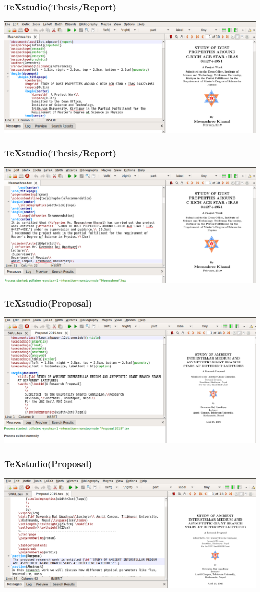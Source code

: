 \documentclass{beamer}
\begin{document}
\begin{frame}
\frametitle{\bf TeXstudio(Thesis/Report)}
\centering
\includegraphics[width=13cm]{Th}
\end{frame}

\begin{frame}
\frametitle{\bf TeXstudio(Thesis/Report)}
\centering
\includegraphics[width=13cm]{Th1}
\end{frame}

\begin{frame}
\frametitle{\bf TeXstudio(Proposal)}
\centering
\includegraphics[width=13cm]{Pr}
\end{frame}

\begin{frame}
\frametitle{\bf TeXstudio(Proposal)}
\centering
\includegraphics[width=13cm]{Pr1}
\end{frame}
\end{document}
